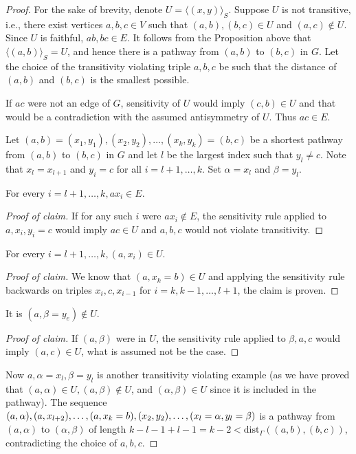 \begin{proof}
	For the sake of brevity, denote $U = \langle(x, y)\rangle_S$. Suppose $U$ is not transitive, i.e., there exist vertices $a, b, c \in V$ such that $(a, b), (b, c) \in U$ and $(a, c) \notin U$. Since $U$ is faithful, $ab, bc \in E$. It follows from the Proposition above that $\langle(a, b)\rangle_S = U$, and hence there is a pathway from $(a, b)$ to $(b, c)$ in $G$. Let the choice of the transitivity violating triple $a, b, c$ be such that the distance of $(a, b)$ and $(b, c)$ is the smallest possible.
	
	If $ac$ were not an edge of $G$, sensitivity of $U$ would imply $(c, b) \in U$ and that would be a contradiction with the assumed antisymmetry of $U$. Thus $ac \in E$.
	
	Let $(a, b) = (x_1 , y_1), (x_2 , y_2), \dots, (x_k , y_k ) = (b, c)$ be a shortest pathway from $(a, b)$ to $(b, c)$ in $G$ and let $l$ be the largest index such that $y_l \neq c$. Note that $x_l = x_{l+1}$ and $y_i = c$ for all $i = l + 1, \dots, k$. Set $\alpha = x_l$ and $\beta = y_l$.
	
	\begin{claim}
		For every $i = l+1, \dots, k, ax_i \in E$.
	\end{claim}
	
	\begin{proof}[Proof of claim]
		If for any such $i$ were $ax_i \notin E$, the sensitivity rule applied to $a, x_i , y_i = c$ would imply $ac \in U$ and $a, b, c$ would not violate transitivity.
	\end{proof}
	
	\begin{claim}
		For every $i = l+1, \dots, k, (a, x_i) \in U$.
	\end{claim}
	
	\begin{proof}[Proof of claim]
		We know that $(a, x_k = b) \in U$ and applying the sensitivity rule backwards on triples $x_i , c, x_{i-1}$ for $i = k, k - 1, \dots, l + 1$, the claim is proven.
	\end{proof}
	
	\begin{claim}
		It is $(a, \beta = y_e) \notin U$.
	\end{claim}
	
	\begin{proof}[Proof of claim]
		If $(a, \beta)$ were in $U$, the sensitivity rule applied to $\beta, a, c$ would imply $(a, c) \in U$, what is assumed not be the case.
	\end{proof}
	
	Now $a, \alpha = x_l , \beta = y_l$ is another transitivity violating example (as we have proved that $(a, \alpha) \in U , (a, \beta) \notin U$, and $(\alpha, \beta) \in U$ since it is included in the pathway). The sequence $(a, \alpha), (a, x_{l+2}), \dots,\\ (a, x_k = b), (x_2 , y_2 ), \dots, (x_l = \alpha, y_l = \beta)$ is a pathway from $(a, \alpha)$ to $(\alpha, \beta)$ of length $k - l-  1 + l - 1 = k - 2 < \text{dist}_\Gamma ((a, b), (b, c))$, contradicting the choice of $a, b, c$.
\end{proof}


